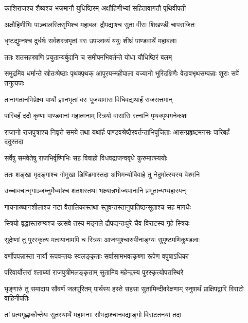 \twolineshloka
{काशिराजश्च शैब्यश्च भजमानौ युधिष्ठिरम्}
{अक्षौहिणीभ्यां सहितावागतौ पृथिवीपती}


\twolineshloka
{अक्षौहिणीभिः पाञ्चालस्तिसृभिश्च महाबलः}
{द्रौपद्याश्च सुता वीराः शिखण्डी चापराजितः}


\twolineshloka
{धृष्टद्युम्नश्च दुर्धर्षः सर्वशस्त्रभृतां वरः}
{उपप्लाव्यं ययुः शीघ्रं पाण्डवार्थे महाबलाः}


\twolineshloka
{ततः शतसहस्राणि प्रयुतान्यर्बुदानि च}
{समीपमभिवर्तन्ते योधा यौधिष्ठिरं बलम्}


\threelineshloka
{समुद्रमिव धर्मान्ते स्रोतःश्रेष्ठाः पृथक्पृथक्}
{आपूरयन्महीपाला यज्वानो भूरिदक्षिणैः}
{वेदावभृथसम्पन्नाः शूराः सर्वे तनुत्यजः}


\twolineshloka
{तानागतानभिप्रेक्ष्य पार्थो ज्ञानभृतां वरः}
{पूजयामास विधिवद्यथार्हं राजसत्तमान्}


\twolineshloka
{पारिबर्हं ददौ कृष्णः पाण्डवानां महात्मनाम्}
{स्त्रियो वासांसि रत्नानि पृथक्पृथगनेकशः}


\threelineshloka
{राजानो राजपुत्राश्च निवृत्ते समये तथा}
{यथांर्ह पाण्डवश्रेष्ठैरवर्तन्ताभिपूजिताः}
{आसन्प्रहृष्टमनसः पारिबर्हं ददुस्तदा}


\twolineshloka
{सर्वेषु समवेतेषु राजभिर्वृष्णिभिः सह}
{विवाहो विधवद्राजन्ववृधे कुरुमात्स्ययोः}


\twolineshloka
{ततः शङ्खा मृदङ्गाश्च गोमुखा डिण्डिमास्तदा}
{अभिमन्योर्विवाहे तु नेदुर्मात्स्यस्य वेश्मनि}


\twolineshloka
{उच्चावचान्मृगाञ्जघ्नुर्मेध्यांश्च शतशस्तथा}
{भक्ष्यान्नभोज्यपानानि प्रभूतान्यभ्यहारयन्}


\twolineshloka
{गायनाख्यानशीलाश्च नटा वैतालिकास्तथा}
{स्तुवन्तस्तानुपातिष्ठन्सूताश्च सह मागधैः}


\twolineshloka
{स्त्रियो वृद्धास्तरुण्यश्च उत्सवे तस्य मङ्गले}
{द्रौपद्यन्तःपुरे चैव विराटस्य गृहे स्त्रियः}


\twolineshloka
{सुदेष्णां तु पुरस्कृत्य मत्स्यानामपि च स्त्रियः}
{आजग्मुश्चारुपीनाङ्ग्यः सुमृष्टमणिकुण्डलाः}


\twolineshloka
{वर्णोपपन्नास्ता नार्यो रूपवन्तयः स्वलङ्कृताः}
{सर्वासामभवत्कृष्णा रूपेण वपुषाऽधिका}


\twolineshloka
{परिवार्योत्तरां श्लाघ्यां राजपुत्रीमलङ्कृताम्}
{सुतामिव महेन्द्रस्य पुरस्कृत्योपतस्थिरे}


\threelineshloka
{भृङ्गारुं तु समादाय सौवर्णं जलपूरितम्}
{पार्थस्य हस्ते सहसा सुतामिन्दीवरेक्षणाम्}
{स्नुषार्थं प्राक्षिपद्वारि विराटो वाहिनीपतिः}


\twolineshloka
{तां प्रत्यगृह्णाकौन्तेयः सुतस्यार्थे महामनाः}
{सौभद्राश्चानवद्याङ्गो विराटतनयां तदा}



